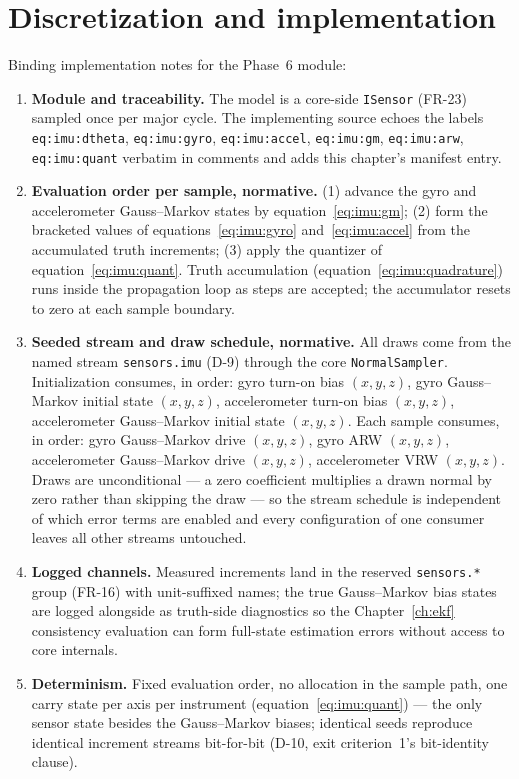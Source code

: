 \section{Discretization and implementation}
\label{sec:imu:implementation}

Binding implementation notes for the Phase~6 module:
\begin{enumerate}
  \item \textbf{Module and traceability.} The model is a core-side
    \texttt{ISensor} (FR-23) sampled once per major cycle. The
    implementing source echoes the labels \texttt{eq:imu:dtheta},
    \texttt{eq:imu:gyro}, \texttt{eq:imu:accel}, \texttt{eq:imu:gm},
    \texttt{eq:imu:arw}, \texttt{eq:imu:quant} verbatim in comments and
    adds this chapter's manifest entry.
  \item \textbf{Evaluation order per sample, normative.} (1) advance the
    gyro and accelerometer Gauss--Markov states by
    equation~\eqref{eq:imu:gm}; (2) form the bracketed values of
    equations~\eqref{eq:imu:gyro} and~\eqref{eq:imu:accel} from the
    accumulated truth increments; (3) apply the quantizer of
    equation~\eqref{eq:imu:quant}. Truth accumulation
    (equation~\eqref{eq:imu:quadrature}) runs inside the propagation
    loop as steps are accepted; the accumulator resets to zero at each
    sample boundary.
  \item \textbf{Seeded stream and draw schedule, normative.} All draws
    come from the named stream \texttt{sensors.imu} (D-9) through the
    core \texttt{NormalSampler}. Initialization consumes, in order:
    gyro turn-on bias $(x,y,z)$, gyro Gauss--Markov initial state
    $(x,y,z)$, accelerometer turn-on bias $(x,y,z)$, accelerometer
    Gauss--Markov initial state $(x,y,z)$. Each sample consumes, in
    order: gyro Gauss--Markov drive $(x,y,z)$, gyro ARW $(x,y,z)$,
    accelerometer Gauss--Markov drive $(x,y,z)$, accelerometer VRW
    $(x,y,z)$. Draws are unconditional --- a zero coefficient multiplies
    a drawn normal by zero rather than skipping the draw --- so the
    stream schedule is independent of which error terms are enabled and
    every configuration of one consumer leaves all other streams
    untouched.
  \item \textbf{Logged channels.} Measured increments land in the
    reserved \texttt{sensors.*} group (FR-16) with unit-suffixed names;
    the true Gauss--Markov bias states are logged alongside as
    truth-side diagnostics so the Chapter~\ref{ch:ekf} consistency
    evaluation can form full-state estimation errors without access to
    core internals.
  \item \textbf{Determinism.} Fixed evaluation order, no allocation in
    the sample path, one carry state per axis per instrument
    (equation~\eqref{eq:imu:quant}) --- the only sensor state besides
    the Gauss--Markov biases; identical seeds reproduce identical
    increment streams bit-for-bit (D-10, exit criterion~1's
    bit-identity clause).
\end{enumerate}

